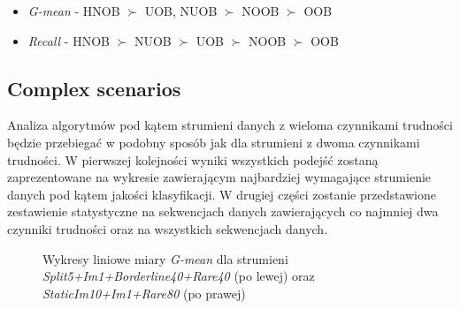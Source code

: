 \begin{itemize}
    \item \textit{G-mean} - HNOB $\succ$ UOB, NUOB $\succ$ NOOB $\succ$ OOB
    \item \textit{Recall} - HNOB $\succ$ NUOB $\succ$ UOB $\succ$ NOOB $\succ$ OOB
\end{itemize}

\subsection{Complex scenarios}

\noindent Analiza algorytmów pod kątem strumieni danych z wieloma czynnikami trudności będzie przebiegać w podobny sposób jak dla strumieni z dwoma czynnikami trudności. W pierwszej kolejności wyniki wszystkich podejść zostaną zaprezentowane na wykresie zawierającym najbardziej wymagające strumienie danych pod kątem jakości klasyfikacji. W drugiej części zostanie przedstawione zestawienie statystyczne na sekwencjach danych zawierających co najmniej dwa czynniki trudności oraz na wszystkich sekwencjach danych.

\newpage

\begin{figure}[h]
    \centering
    \qquad
    \caption{Wykresy liniowe miary \textit{G-mean} dla strumieni \textit{Split5+Im1+Borderline40+Rare40} (po lewej) oraz \textit{StaticIm10+Im1+Rare80} (po prawej)}
\end{figure}

